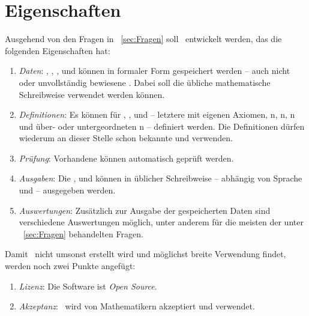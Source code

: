 \section{Eigenschaften}%
\label{sec:Eigenschaften}

Ausgehend von den Fragen in \sectionname~\vref{sec:Fragen}
soll \ASBA\ entwickelt werden, das die folgenden Eigenschaften hat:
\begin{enumerate}
	
	\item \label{Eigenschaft:Daten} \emph{Daten}:
	, , ,  und  können in formaler Form gespeichert werden -- auch nicht oder unvollständig bewiesene .
	Dabei soll die übliche mathematische Schreibweise verwendet werden können.
	
	\item \label{Eigenschaft:Definitionen} \emph{Definitionen}:
	Es können  für , ,  und  -- letztere mit eigenen Axiomen, n, n, n und über- oder untergeordneten n -- definiert werden.
	Die Definitionen dürfen wiederum an dieser Stelle schon bekannte  und  verwenden.
	
	\item \label{Eigenschaft:Prüfung} \emph{Prüfung}:
	Vorhandene  können automatisch geprüft werden.
	
	\item \label{Eigenschaft:Ausgaben} \emph{Ausgaben}:
	Die ,  und  können in üblicher Schreibweise -- abhängig von Sprache und  -- ausgegeben werden.
	
	\item \label{Eigenschaft:Auswertungen} \emph{Auswertungen}:
	Zusätzlich zur Ausgabe der gespeicherten Daten sind verschiedene Auswertungen möglich, unter anderem für die meisten der unter \sectionname~\vref{sec:Fragen} behandelten Fragen.
	
	\setcounter{Enumi}{\value{enumi}}%
\end{enumerate}
Damit \ASBA\ nicht umsonst erstellt wird und möglichst breite Verwendung findet, werden noch zwei Punkte angefügt:
\begin{enumerate}
	\setcounter{enumi}{\value{Enumi}}%
	
	\item \label{Eigenschaft:Lizenz} \emph{Lizenz}:
	Die Software ist \emph{Open Source}.
	
	\item \label{Eigenschaft:Akzeptanz} \emph{Akzeptanz}:
	\ASBA\ wird von Mathematikern akzeptiert und verwendet.
\end{enumerate}

